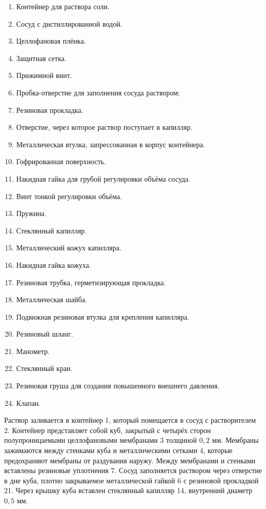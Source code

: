 \begin{multicols}{2}
	\begin{spacing}{0.3}
		\begin{enumerate}
			\item Контейнер для раствора соли.
			\item Сосуд с дистиллированной водой.
			\item Целлофановая плёнка.
			\item Защитная сетка.
			\item Прижимной винт.
			\item Пробка-отверстие для заполнения сосуда раствором;
			\item Резиновая прокладка.
			\item Отверстие, через которое раствор поступает в капилляр.
			\item Металлическая втулка, запрессованная в корпус контейнера.
			\item Гофрированная поверхность.
			\item Накидная гайка для грубой регулировки объёма сосуда.
			\item Винт тонкой регулировки объёма.
			\item Пружина.
			\item Стеклянный капилляр.
			\item Металлический кожух капилляра.
			\item Накидная гайка кожуха.
			\item Резиновая трубка, герметизирующая прокладка.
			\item Металлическая шайба.
			\item Подвижная резиновая втулка для крепления капилляра.
			\item Резиновый шланг.
			\item Манометр.
			\item Стеклянный кран.
			\item Резиновая груша для создания повышенного внешнего давления.
			\item Клапан.
		\end{enumerate}
	\end{spacing}

\end{multicols}
	
\newpage
	
Раствор заливается в контейнер 1, который помещается в сосуд с растворителем 2. Контейнер представляет собой куб, закрытый с четырёх сторон полупроницаемыми целлофановыми мембранами 3 толщиной $0,2$ мм. Мембраны зажимаются между стенками куба и металлическими сетками 4, которые предохраняют мембраны от раздувания наружу. Между мембранами и стенками вставлены резиновые уплотнения 7. Сосуд заполняется раствором через отверстие в дне куба, плотно закрываемое металлической гайкой 6 с резиновой прокладкой 21. Через крышку куба вставлен стеклянный капилляр 14, внутренний диаметр $0,5$ мм.

